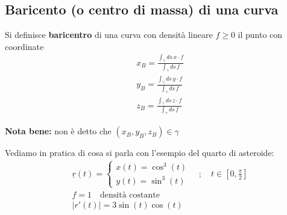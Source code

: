 \subsection{Baricento (o centro di massa) di una curva}

Si definisce \textbf{baricentro} di una curva con densità lineare $f\geq 0$ il punto con coordinate
\begin{align}
{}&x_B=\frac{\int_{\gamma}ds \, x\cdot f}{\int_{\gamma}ds \, f} \\
&y_B=\frac{\int_{\gamma}ds \, y\cdot f}{\int_{\gamma}ds \, f} \\
&z_B=\frac{\int_{\gamma}ds \, z\cdot f}{\int_{\gamma}ds \, f}
\end{align}

\textbf{Nota bene:} non è detto che $(x_B,y_B,z_B)\in\gamma$

Vediamo in pratica di cosa si parla con l'esempio del quarto di asteroide:
\begin{align}
{}&\underline{r}(t)=\left\{
\begin{array}{cc}
x(t)=\cos^3(t)\\
y(t)=\sin^3(t)
\end{array}
\right. \quad ; \quad t\in \left[0,\frac{\pi}{2}\right]\\
&f=1 \quad \text{densità costante}\\
&|r'(t)|= 3 \sin(t)\cos(t) 
\end{align}

